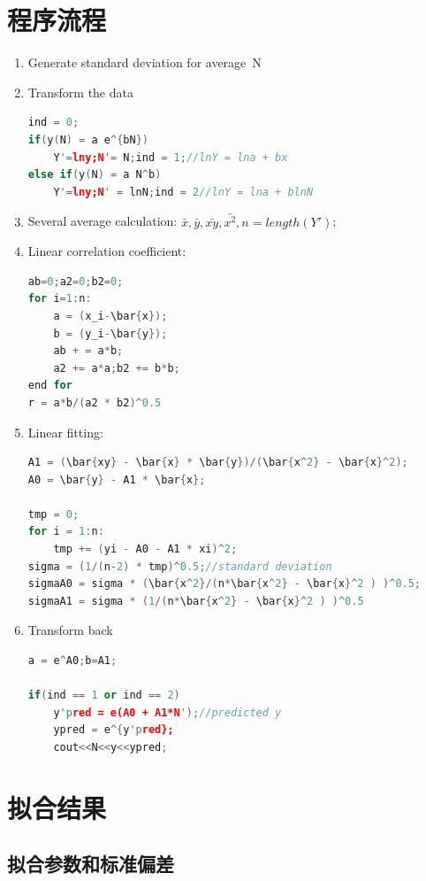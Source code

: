 \documentclass[10pt,a4paper]{article}
\begin{document}
\section{程序流程}
\begin{enumerate}
\item Generate standard deviation for average~N
\item Transform the data
\begin{lstlisting}[language=c++]
ind = 0;
if(y(N) = a e^{bN})
	Y'=lny;N'= N;ind = 1;//lnY = lna + bx
else if(y(N) = a N^b)
	Y'=lny;N' = lnN;ind = 2//lnY = lna + blnN
\end{lstlisting}


\item Several average calculation: $\bar{x}, \bar{y}, \bar{xy}, \bar{x^2}, n=length(Y')$;
\item Linear correlation coefficient:
\begin{lstlisting}[language=c++]
ab=0;a2=0;b2=0;
for i=1:n:
	a = (x_i-\bar{x});
	b = (y_i-\bar{y});
	ab + = a*b;
	a2 += a*a;b2 += b*b;
end for
r = a*b/(a2 * b2)^0.5
\end{lstlisting}


\item Linear fitting:
\begin{lstlisting}[language=c++]
A1 = (\bar{xy} - \bar{x} * \bar{y})/(\bar{x^2} - \bar{x}^2);
A0 = \bar{y} - A1 * \bar{x};

tmp = 0;
for i = 1:n:
	tmp += (yi - A0 - A1 * xi)^2;
sigma = (1/(n-2) * tmp)^0.5;//standard deviation
sigmaA0 = sigma * (\bar{x^2}/(n*\bar{x^2} - \bar{x}^2 ) )^0.5;
sigmaA1 = sigma * (1/(n*\bar{x^2} - \bar{x}^2 ) )^0.5
\end{lstlisting}


\item Transform back
\begin{lstlisting}[language=c++]
a = e^A0;b=A1;

if(ind == 1 or ind == 2)
	y'pred = e(A0 + A1*N');//predicted y
	ypred = e^{y'pred};
	cout<<N<<y<<ypred;
\end{lstlisting}

\end{enumerate}

\section{拟合结果}
\subsection{拟合参数和标准偏差}
\end{document}

